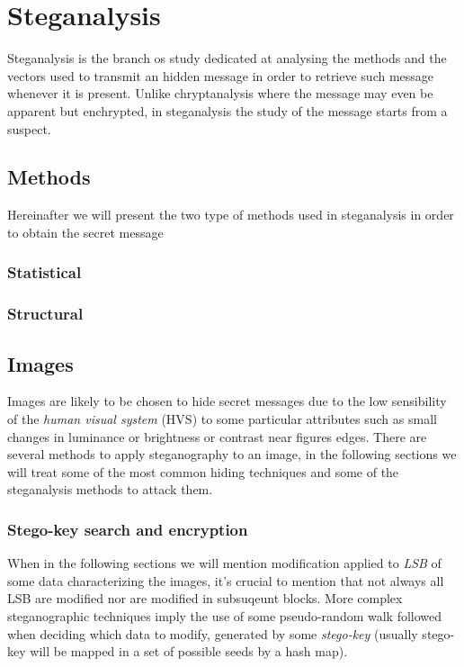 \documentclass[../../main.tex]{subfiles}
\begin{document}
    
    \section{Steganalysis}
    Steganalysis is the branch os study dedicated at analysing the methods and
    the vectors used to transmit an hidden message in order to retrieve such
    message whenever it is present.
    Unlike chryptanalysis where the message may even be apparent but enchrypted,
    in steganalysis the study of the message starts from a suspect.
    \subsection{Methods}
    Hereinafter we will present the two type of methods used in steganalysis in
    order to obtain the secret message 

    \subsubsection{Statistical}

    \subsubsection{Structural}
    


    \subsection{Images}
    Images are likely to be chosen to hide secret messages due to the low
    sensibility of the \emph{human visual system} (HVS) to some particular
    attributes such as small changes in luminance or brightness or contrast near
    figures edges.
    There are several methods to apply steganography to an image, in the
    following sections we will treat some of the most common hiding techniques
    and some of the steganalysis methods to attack them.


    \subsubsection{Stego-key search and encryption}
    When in the following sections we will mention modification applied to
    \emph{LSB} of some data characterizing the images, it's crucial to mention
    that not always all LSB are modified nor are modified in subsuqeunt blocks.
    More complex steganographic techniques imply the use of some pseudo-random
    walk followed when deciding which data to modify, generated by some
    \emph{stego-key} (usually stego-key will be mapped in a set of possible
    seeds by a hash map).
\end{document}
